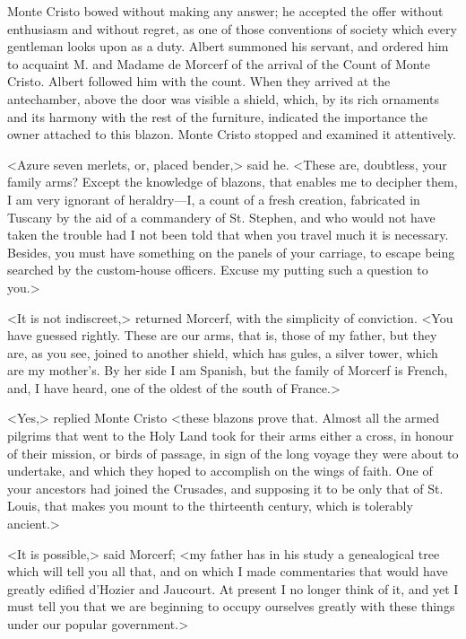  Monte Cristo bowed without making any answer; he accepted the offer without enthusiasm and without regret, as one of those conventions of society which every gentleman looks upon as a duty. Albert summoned his servant, and ordered him to acquaint M. and Madame de Morcerf of the arrival of the Count of Monte Cristo. Albert followed him with the count. When they arrived at the antechamber, above the door was visible a shield, which, by its rich ornaments and its harmony with the rest of the furniture, indicated the importance the owner attached to this blazon. Monte Cristo stopped and examined it attentively. 

 <Azure seven merlets, or, placed bender,> said he. <These are, doubtless, your family arms? Except the knowledge of blazons, that enables me to decipher them, I am very ignorant of heraldry—I, a count of a fresh creation, fabricated in Tuscany by the aid of a commandery of St. Stephen, and who would not have taken the trouble had I not been told that when you travel much it is necessary. Besides, you must have something on the panels of your carriage, to escape being searched by the custom-house officers. Excuse my putting such a question to you.> 

 <It is not indiscreet,> returned Morcerf, with the simplicity of conviction. <You have guessed rightly. These are our arms, that is, those of my father, but they are, as you see, joined to another shield, which has gules, a silver tower, which are my mother's. By her side I am Spanish, but the family of Morcerf is French, and, I have heard, one of the oldest of the south of France.> 

 <Yes,> replied Monte Cristo <these blazons prove that. Almost all the armed pilgrims that went to the Holy Land took for their arms either a cross, in honour of their mission, or birds of passage, in sign of the long voyage they were about to undertake, and which they hoped to accomplish on the wings of faith. One of your ancestors had joined the Crusades, and supposing it to be only that of St. Louis, that makes you mount to the thirteenth century, which is tolerably ancient.> 

 <It is possible,> said Morcerf; <my father has in his study a genealogical tree which will tell you all that, and on which I made commentaries that would have greatly edified d'Hozier and Jaucourt. At present I no longer think of it, and yet I must tell you that we are beginning to occupy ourselves greatly with these things under our popular government.> 

